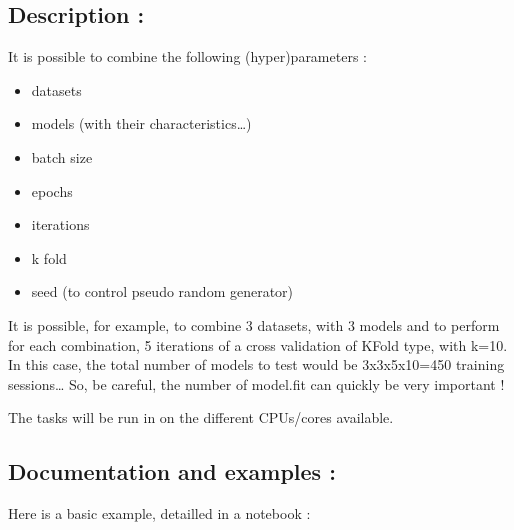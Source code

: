 \documentclass[letterpaper,10pt,english]{sphinxmanual}
\begin{document}
\subsection{Description :}
\label{\detokenize{PyTerK:description}}
\sphinxAtStartPar
It is possible to combine the following (hyper)parameters :
\begin{itemize}
\item {} 
\sphinxAtStartPar
datasets

\item {} 
\sphinxAtStartPar
models (with their characteristics…)

\item {} 
\sphinxAtStartPar
batch size

\item {} 
\sphinxAtStartPar
epochs

\item {} 
\sphinxAtStartPar
iterations

\item {} 
\sphinxAtStartPar
k fold

\item {} 
\sphinxAtStartPar
seed (to control pseudo random generator)

\end{itemize}

\sphinxAtStartPar
It is possible, for example, to combine 3 datasets, with 3 models and to perform for each combination, 5 iterations of a cross validation of KFold type, with k=10.
In this case, the total number of models to test would be 3x3x5x10=450 training sessions…
So, be careful, the number of model.fit can quickly be very important !

\sphinxAtStartPar
The tasks will be run in  on the different CPUs/cores available.


\subsection{Documentation and examples :}
\label{\detokenize{PyTerK:documentation-and-examples}}
\sphinxAtStartPar
Here is a basic example, detailled in a notebook :
\end{document}
